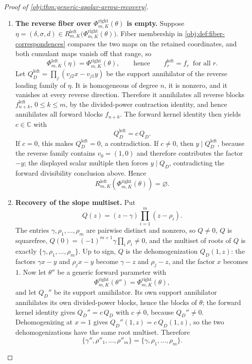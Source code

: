 \documentclass[11pt]{article}
\begin{document}
\begin{proof}[Proof of \cref{obj:thm:generic-apolar-arrow-recovery}]
\begin{enumerate}
\item \textbf{The reverse fiber over \(\Phi^{\mathrm{right}}_{m,K}(\theta)\) is empty.}  Suppose \(\eta=(\delta,\sigma,d)\in R^{\mathrm{left}}_{m,K}\!\bigl(\Phi^{\mathrm{right}}_{m,K}(\theta)\bigr)\).  Fiber membership in \cref{obj:def:fiber-correspondences} compares the two maps on the retained coordinates, and both cumulant maps vanish off that range, so
\[
\Phi^{\mathrm{left}}_{m,K}(\eta)=\Phi^{\mathrm{right}}_{m,K}(\theta),
\qquad\text{hence}\qquad
f^{\mathrm{left}}_r=f_r\ \text{ for all }r .
\]
Let \(Q_D^{\mathrm{left}}=\prod_j(v_{j2}x-v_{j1}y)\) be the support annihilator of the reverse loading family of \(\eta\).  It is homogeneous of degree \(n\), it is nonzero, and it vanishes at every reverse direction.  Therefore it annihilates all reverse blocks \(f^{\mathrm{left}}_{n+k}\), \(0\le k\le m\), by the divided-power contraction identity, and hence annihilates all forward blocks \(f_{n+k}\).  The forward kernel identity then yields \(c\in\mathbb C\) with
\[
Q_D^{\mathrm{left}}=c\,Q_D .
\]
If \(c=0\), this makes \(Q_D^{\mathrm{left}}=0\), a contradiction.  If \(c\ne0\), then \(y\mid Q_D^{\mathrm{left}}\), because the reverse family contains \(v_0=(1,0)\) and therefore contributes the factor \(-y\); the displayed scalar multiple then forces \(y\mid Q_D\), contradicting the forward divisibility conclusion above.  Hence
\[
R^{\mathrm{left}}_{m,K}\!\left(\Phi^{\mathrm{right}}_{m,K}(\theta)\right)=\varnothing .
\]

\item \textbf{Recovery of the slope multiset.}  Put
\[
Q(z)=(z-\gamma)\prod_{i=1}^{m}(z-\rho_i).
\]
The entries \(\gamma,\rho_1,\ldots,\rho_m\) are pairwise distinct and nonzero, so \(Q\ne0\), \(Q\) is squarefree, \(Q(0)=(-1)^{m+1}\gamma\prod_i\rho_i\ne0\), and the multiset of roots of \(Q\) is exactly \(\{\gamma,\rho_1,\ldots,\rho_m\}\).  Up to sign, \(Q\) is the dehomogenization \(Q_D(1,z)\): the factors \(\gamma x-y\) and \(\rho_jx-y\) become \(\gamma-z\) and \(\rho_j-z\), and the factor \(x\) becomes \(1\).  Now let \(\theta''\) be a generic forward parameter with
\[
\Phi^{\mathrm{right}}_{m,K}(\theta'')=\Phi^{\mathrm{right}}_{m,K}(\theta),
\]
and let \(Q_D''\) be its support annihilator.  Its own support annihilator annihilates its own divided-power blocks, hence the blocks of \(\theta\); the forward kernel identity gives \(Q_D''=c\,Q_D\) with \(c\ne0\), because \(Q_D''\ne0\).  Dehomogenizing at \(x=1\) gives \(Q_D''(1,z)=c\,Q_D(1,z)\), so the two dehomogenizations have the same root multiset.  Therefore
\[
\{\gamma'',\rho''_1,\ldots,\rho''_m\}=\{\gamma,\rho_1,\ldots,\rho_m\}.
\]


\end{enumerate}
\end{proof}
\end{document}
